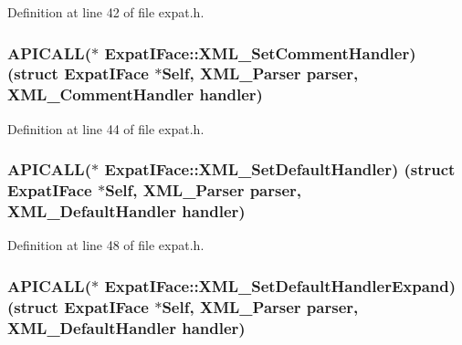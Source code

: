 Definition at line 42 of file expat.\+h.

\subsubsection[{\texorpdfstring{X\+M\+L\+\_\+\+Set\+Comment\+Handler}{XML_SetCommentHandler}}]{ A\+P\+I\+C\+A\+LL($\ast$ Expat\+I\+Face\+::\+X\+M\+L\+\_\+\+Set\+Comment\+Handler) (struct {\bf Expat\+I\+Face} $\ast$Self, {\bf X\+M\+L\+\_\+\+Parser} parser, {\bf X\+M\+L\+\_\+\+Comment\+Handler} handler)}\hypertarget{struct_expat_i_face_aa7b18798fcf53cc0e1a79e10bb49a330}{}\label{struct_expat_i_face_aa7b18798fcf53cc0e1a79e10bb49a330}


Definition at line 44 of file expat.\+h.

\subsubsection[{\texorpdfstring{X\+M\+L\+\_\+\+Set\+Default\+Handler}{XML_SetDefaultHandler}}]{ A\+P\+I\+C\+A\+LL($\ast$ Expat\+I\+Face\+::\+X\+M\+L\+\_\+\+Set\+Default\+Handler) (struct {\bf Expat\+I\+Face} $\ast$Self, {\bf X\+M\+L\+\_\+\+Parser} parser, {\bf X\+M\+L\+\_\+\+Default\+Handler} handler)}\hypertarget{struct_expat_i_face_a3b984df3014894999017b7739af71472}{}\label{struct_expat_i_face_a3b984df3014894999017b7739af71472}


Definition at line 48 of file expat.\+h.

\subsubsection[{\texorpdfstring{X\+M\+L\+\_\+\+Set\+Default\+Handler\+Expand}{XML_SetDefaultHandlerExpand}}]{ A\+P\+I\+C\+A\+LL($\ast$ Expat\+I\+Face\+::\+X\+M\+L\+\_\+\+Set\+Default\+Handler\+Expand) (struct {\bf Expat\+I\+Face} $\ast$Self, {\bf X\+M\+L\+\_\+\+Parser} parser, {\bf X\+M\+L\+\_\+\+Default\+Handler} handler)}\hypertarget{struct_expat_i_face_a1c5dd415b219e25d57787b14f8d00213}{}\label{struct_expat_i_face_a1c5dd415b219e25d57787b14f8d00213}


